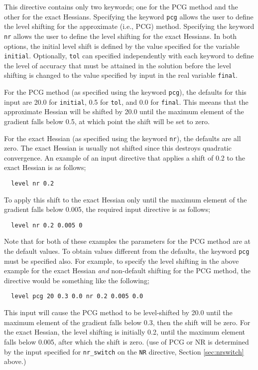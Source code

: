 This directive contains only two keywords; one for the PCG method and
the other for the exact Hessians.  Specifying the keyword \verb+pcg+
allows the user to define the level shifting for the approximate
(i.e., PCG) method.  Specifying the keyword \verb+nr+ allows the user
to define the level shifting for the exact Hessians.  In both options,
the initial level shift is defined by the value specified for the
variable \verb+initial+.  Optionally, \verb+tol+ can specified
independently with each keyword to define the level of accuracy that
must be attained in the solution before the level shifting is changed
to the value specified by input in the real variable \verb+final+.

For the PCG method (as specified using the keyword \verb+pcg+), the
defaults for this input are 20.0 for \verb+initial+, 0.5 for
\verb+tol+, and 0.0 for \verb+final+.  This meeans that the
approximate Hessian will be shifted by 20.0 until the maximum element
of the gradient falls below 0.5, at which point the shift will be set
to zero.

For the exact Hessian (as specified using the keyword \verb+nr+), the
defaults are all zero.  The exact Hessian is usually not shifted since
this destroys quadratic convergence.  An example of an input directive
that applies a shift of 0.2 to the exact Hessian is as follows;

\begin{verbatim}
  level nr 0.2
\end{verbatim}

To apply this shift to the exact Hessian only until the maximum
element of the gradient falls below 0.005, the required input
directive is as follows;

\begin{verbatim}
  level nr 0.2 0.005 0
\end{verbatim}

Note that for both of these examples the parameters for the PCG method
are at the default values.  To obtain values different from the
defaults, the keyword \verb+pcg+ must be specified also.  For example,
to specify the level shifting in the above example for the exact
Hessian {\em and} non-default shifting for the PCG method, the
directive would be something like the following;

\begin{verbatim}
  level pcg 20 0.3 0.0 nr 0.2 0.005 0.0
\end{verbatim}

This input will cause the PCG method to be level-shifted by 20.0 until
the maximum element of the gradient falls below 0.3, then the shift
will be zero.  For the exact Hessian, the level shifting is initially
0.2, until the maximum element falls below 0.005, after which the
shift is zero.  (use of PCG or NR is determined by the input specified
for \verb+nr_switch+ on the \verb+NR+ directive, Section
\ref{sec:nrswitch} above.)

